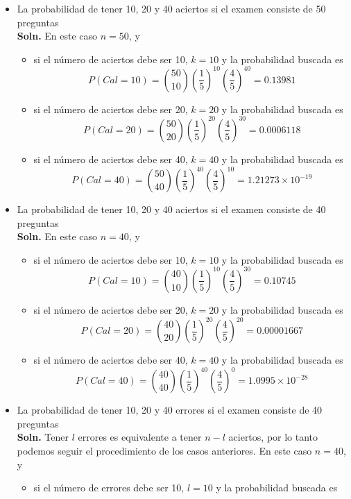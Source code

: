 \documentclass[letterpaper,11pt]{article}
\begin{document}
\begin{enumerate}
\begin{itemize}
\item La probabilidad de tener 10, 20 y 40 aciertos si el examen consiste de 50 preguntas\\
    {\bf Soln.} En este caso $n=50$, y
    \begin{itemize}
        \item si el número de aciertos debe ser 10, $k=10$ y la probabilidad buscada es
            \[P(Cal=10)=\binom{50}{10}\left(\frac{1}{5}\right)^{10}\left(\frac{4}{5}\right)^{40}=0.13981\]
        \item si el número de aciertos debe ser 20, $k=20$ y la probabilidad buscada es
            \[P(Cal=20)=\binom{50}{20}\left(\frac{1}{5}\right)^{20}\left(\frac{4}{5}\right)^{30}=
            0.0006118\]
        \item si el número de aciertos debe ser 40, $k=40$ y la probabilidad buscada es
            \[P(Cal=40)=\binom{50}{40}\left(\frac{1}{5}\right)^{40}\left(\frac{4}{5}\right)^{10}=1.21273\times
            10^{-19}\]
    \end{itemize}
\item La probabilidad de tener 10, 20 y 40 aciertos si el examen consiste de 40 preguntas\\
    {\bf Soln.} En este caso $n=40$, y
    \begin{itemize}
        \item si el número de aciertos debe ser 10, $k=10$ y la probabilidad buscada es
        \[P(Cal=10)=\binom{40}{10}\left(\frac{1}{5}\right)^{10}\left(\frac{4}{5}\right)^{30}=
        0.10745\]
        \item si el número de aciertos debe ser 20, $k=20$ y la probabilidad buscada es
            \[P(Cal=20)=\binom{40}{20}\left(\frac{1}{5}\right)^{20}\left(\frac{4}{5}\right)^{20}=0.00001667\]
        \item si el número de aciertos debe ser 40, $k=40$ y la probabilidad buscada es
            \[P(Cal=40)=\binom{40}{40}\left(\frac{1}{5}\right)^{40}\left(\frac{4}{5}\right)^0=
            1.0995\times 10^{-28}\]
    \end{itemize}
\item La probabilidad de tener 10, 20 y 40 errores si el examen consiste de 40 preguntas\\
    {\bf Soln.} Tener $l$ errores es equivalente a tener $n-l$ aciertos, por lo tanto podemos seguir el
    procedimiento de los casos anteriores. En este caso $n=40$, y
    \begin{itemize}
        \item si el número de errores debe ser 10, $l=10$ y la probabilidad buscada es

\end{itemize}
\end{itemize}
\end{enumerate}
\end{document}
